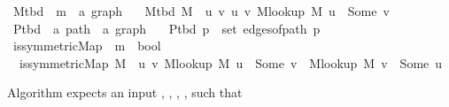 \begin{isabellebody}
\isanewline
{}\isamarkupfalse%
\ M{\isacharunderscore}{\kern0pt}tbd\ {\isacharcolon}{\kern0pt}{\isacharcolon}{\kern0pt}\ {\isachardoublequoteopen}{\isacharprime}{\kern0pt}m\ {\isasymRightarrow}\ {\isacharprime}{\kern0pt}a\ graph{\isachardoublequoteclose}\ \isanewline
\ \ {\isachardoublequoteopen}M{\isacharunderscore}{\kern0pt}tbd\ M\ {\isasymequiv}\ {\isacharbraceleft}{\kern0pt}{\isacharbraceleft}{\kern0pt}u{\isacharcomma}{\kern0pt}\ v{\isacharbraceright}{\kern0pt}\ {\isacharbar}{\kern0pt}u\ v{\isachardot}{\kern0pt}\ M{\isacharunderscore}{\kern0pt}lookup\ M\ u\ {\isacharequal}{\kern0pt}\ Some\ v{\isacharbraceright}{\kern0pt}{\isachardoublequoteclose}\isanewline
\isanewline
\isanewline
{}\isamarkupfalse%
\ P{\isacharunderscore}{\kern0pt}tbd\ {\isacharcolon}{\kern0pt}{\isacharcolon}{\kern0pt}\ {\isachardoublequoteopen}{\isacharprime}{\kern0pt}a\ path\ {\isasymRightarrow}\ {\isacharprime}{\kern0pt}a\ graph{\isachardoublequoteclose}\ \isanewline
\ \ {\isachardoublequoteopen}P{\isacharunderscore}{\kern0pt}tbd\ p\ {\isasymequiv}\ set\ {\isacharparenleft}{\kern0pt}edges{\isacharunderscore}{\kern0pt}of{\isacharunderscore}{\kern0pt}path\ p{\isacharparenright}{\kern0pt}{\isachardoublequoteclose}\isanewline
\isanewline
{}\isamarkupfalse%
\ is{\isacharunderscore}{\kern0pt}symmetric{\isacharunderscore}{\kern0pt}Map\ {\isacharcolon}{\kern0pt}{\isacharcolon}{\kern0pt}\ {\isachardoublequoteopen}{\isacharprime}{\kern0pt}m\ {\isasymRightarrow}\ bool{\isachardoublequoteclose}\ \isanewline
\ \ {\isachardoublequoteopen}is{\isacharunderscore}{\kern0pt}symmetric{\isacharunderscore}{\kern0pt}Map\ M\ {\isasymequiv}\ {\isasymforall}u\ v{\isachardot}{\kern0pt}\ M{\isacharunderscore}{\kern0pt}lookup\ M\ u\ {\isacharequal}{\kern0pt}\ Some\ v\ {\isasymlongleftrightarrow}\ M{\isacharunderscore}{\kern0pt}lookup\ M\ v\ {\isacharequal}{\kern0pt}\ Some\ u{\isachardoublequoteclose}\isanewline
\isanewline
{}\isamarkupfalse%
%
\isadelimdocument
%
\endisadelimdocument
%
\isatagdocument
%
\isamarkuptrue%
%
\isamarkuptrue%
%
\endisatagdocument
{\isafolddocument}%
%
\isadelimdocument
%
\endisadelimdocument
%
\begin{isamarkuptext}%
Algorithm  expects an input , , ,
,  such that


\end{isamarkuptext}
\end{isabellebody}
